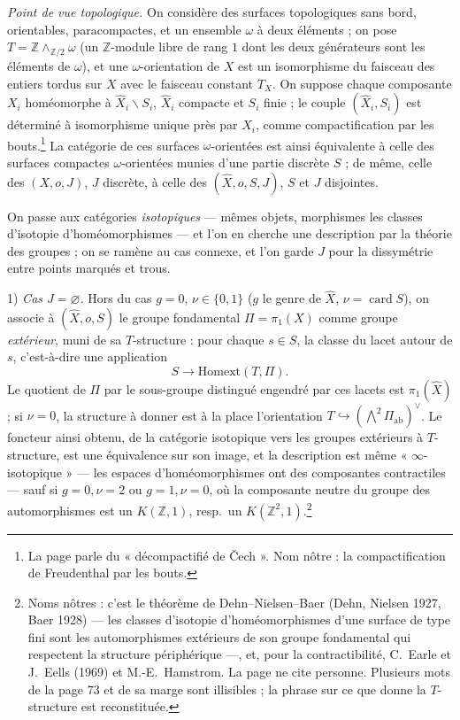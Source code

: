 \documentclass[11pt,a4paper]{article}
\begin{document}
\emph{Point de vue topologique.} On considère des surfaces topologiques sans
bord, orientables, paracompactes, et un ensemble $\omega$ à deux éléments ; on
pose $T = \mathbb{Z} \wedge_{\mathbb{Z}/2} \omega$ (un $\mathbb{Z}$-module libre de
rang $1$ dont les deux générateurs sont les éléments de $\omega$), et une
$\omega$-orientation de $X$ est un isomorphisme du faisceau des entiers tordus
sur $X$ avec le faisceau constant $T_{X}$. On suppose chaque composante $X_{i}$
homéomorphe à $\hat{X}_{i} \smallsetminus S_{i}$, $\hat{X}_{i}$ compacte et
$S_{i}$ finie ; le couple $(\hat{X}_{i}, S_{i})$ est déterminé à isomorphisme
unique près par $X_{i}$, comme compactification par les bouts.\footnote{La
page parle du « décompactifié de Čech ». Nom nôtre : la compactification de
Freudenthal par les bouts.} La catégorie de ces surfaces
$\omega$-orientées est ainsi équivalente à celle des surfaces compactes
$\omega$-orientées munies d'une partie discrète $S$ ; de même, celle des
$(X, o, J)$, $J$ discrète, à celle des $(\hat{X}, o, S, J)$, $S$ et $J$ disjointes.

On passe aux catégories \emph{isotopiques} --- mêmes objets, morphismes les
classes d'isotopie d'homéomorphismes --- et l'on en cherche une description
par la théorie des groupes ; on se ramène au cas connexe, et l'on garde $J$
pour la dissymétrie entre points marqués et trous.

1) \emph{Cas $J = \varnothing$.} Hors du cas $g = 0$, $\nu \in \{0, 1\}$ ($g$ le
genre de $\hat{X}$, $\nu = \operatorname{card} S$), on associe à $(\hat{X},
o, S)$ le groupe fondamental $\Pi = \pi_{1}(X)$ comme groupe \emph{extérieur},
muni de sa $T$-structure : pour chaque $s \in S$, la classe du lacet autour de
$s$, c'est-à-dire une application
\[
S \longrightarrow \mathrm{Homext}(T, \Pi).
\]
Le quotient de $\Pi$ par le sous-groupe distingué engendré par ces lacets est
$\pi_{1}(\hat{X})$ ; si $\nu = 0$, la structure à donner est à la place
l'orientation $T \hookrightarrow (\bigwedge^{2} \Pi_{\mathrm{ab}})^{\vee}$. Le
foncteur ainsi obtenu, de la catégorie isotopique vers les groupes extérieurs
à $T$-structure, est une équivalence sur son image, et la description est
même « $\infty$-isotopique » --- les espaces d'homéomorphismes ont des
composantes contractiles --- sauf si $g = 0, \nu = 2$ ou $g = 1, \nu = 0$, où la
composante neutre du groupe des automorphismes est un $K(\mathbb{Z}, 1)$,
resp.\ un $K(\mathbb{Z}^{2}, 1)$.\footnote{Noms nôtres : c'est le théorème de
Dehn--Nielsen--Baer (Dehn, Nielsen 1927, Baer 1928) --- les classes d'isotopie
d'homéomorphismes d'une surface de type fini sont les automorphismes
extérieurs de son groupe fondamental qui respectent la structure
périphérique ---, et, pour la contractibilité, C.~Earle et J.~Eells (1969) et
M.-E.~Hamstrom. La page ne cite personne. Plusieurs mots de la page 73 et de
sa marge sont illisibles ; la phrase sur ce que donne la $T$-structure est
reconstituée.}
\end{document}

